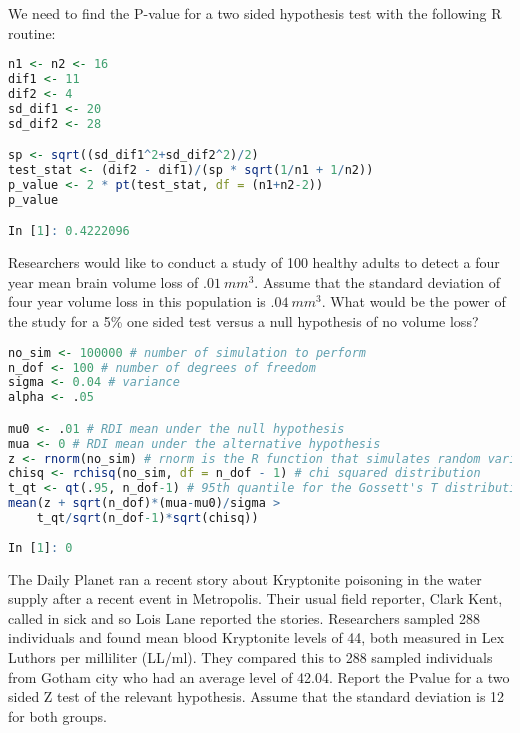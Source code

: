 \documentclass{homework}
\begin{document}
We need to find the P-value for a two sided hypothesis test with the following R routine: 

\begin{lstlisting}[language=R]
n1 <- n2 <- 16
dif1 <- 11
dif2 <- 4
sd_dif1 <- 20
sd_dif2 <- 28

sp <- sqrt((sd_dif1^2+sd_dif2^2)/2)
test_stat <- (dif2 - dif1)/(sp * sqrt(1/n1 + 1/n2))
p_value <- 2 * pt(test_stat, df = (n1+n2-2))
p_value

In [1]: 0.4222096
\end{lstlisting}

\begin{tcolorbox}[title=Question 8]
Researchers would like to conduct a study of 100 healthy adults to detect a four year mean brain volume loss of $.01~mm^3$. Assume that the standard deviation of four year volume loss in this population is $.04~mm^3$. What would be the power of the study for a 5\% one sided test versus a null hypothesis of no volume loss?
\end{tcolorbox}

\begin{lstlisting}[language=R]
no_sim <- 100000 # number of simulation to perform 
n_dof <- 100 # number of degrees of freedom
sigma <- 0.04 # variance 
alpha <- .05 

mu0 <- .01 # RDI mean under the null hypothesis
mua <- 0 # RDI mean under the alternative hypothesis
z <- rnorm(no_sim) # rnorm is the R function that simulates random variables having a specified normal distribution
chisq <- rchisq(no_sim, df = n_dof - 1) # chi squared distribution
t_qt <- qt(.95, n_dof-1) # 95th quantile for the Gossett's T distribution
mean(z + sqrt(n_dof)*(mua-mu0)/sigma > 
    t_qt/sqrt(n_dof-1)*sqrt(chisq))
    
In [1]: 0
\end{lstlisting}

\begin{tcolorbox}[title=Question 9]
The Daily Planet ran a recent story about Kryptonite poisoning in the water supply after a recent event in Metropolis. Their usual field reporter, Clark Kent, called in sick and so Lois Lane reported the stories. Researchers sampled 288 individuals and found mean blood Kryptonite levels of 44, both measured in Lex Luthors per milliliter (LL/ml). They compared this to 288 sampled individuals from Gotham city who had an average level of 42.04. Report the Pvalue for a two sided Z test of the relevant hypothesis. Assume that the standard deviation is 12 for both groups.
\end{tcolorbox}
\end{document}
